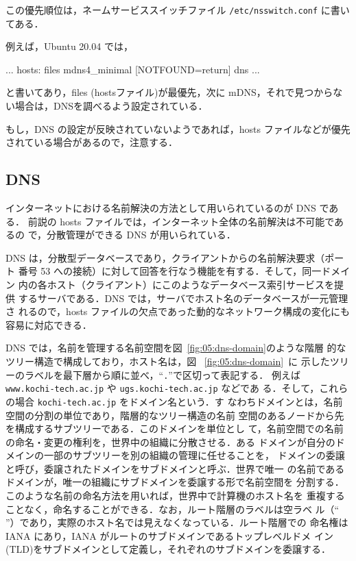 この優先順位は，ネームサービススイッチファイル \texttt{/etc/nsswitch.conf}  に書いてある．

例えば，Ubuntu 20.04 では，
\begin{cli}
...
hosts:          files mdns4_minimal [NOTFOUND=return] dns
...
\end{cli}
と書いてあり，files (hostsファイル)が最優先，次に mDNS，それで見つからない場合は，DNSを調べるよう設定されている．

もし，DNS の設定が反映されていないようであれば，hosts ファイルなどが優先されている場合があるので，注意する．

\subsection*{DNS}
インターネットにおける名前解決の方法として用いられているのが DNS である．
前説の hosts ファイルでは，インターネット全体の名前解決は不可能であるの
で，分散管理ができる DNS が用いられている．

DNS は，分散型データベースであり，クライアントからの名前解決要求（ポート
番号 53 への接続）に対して回答を行なう機能を有する．そして，同一ドメイン
内の各ホスト（クライアント）にこのようなデータベース索引サービスを提供
するサーバである．DNS では，サーバでホスト名のデータベースが一元管理さ
れるので，hosts ファイルの欠点であった動的なネットワーク構成の変化にも
容易に対応できる．

DNS では，名前を管理する名前空間を図~\ref{fig:05:dns-domain}のような階層
的なツリー構造で構成しており，ホスト名は，図~ \ref{fig:05:dns-domain}~に
示したツリーのラベルを最下層から順に並べ，``\verb|.|''で区切って表記する．
例えば \verb|www.kochi-tech.ac.jp| や \verb|ugs.kochi-tech.ac.jp| などであ
る．そして，これらの場合 \verb|kochi-tech.ac.jp| をドメイン名という．す
なわちドメインとは，名前空間の分割の単位であり，階層的なツリー構造の名前
空間のあるノードから先を構成するサブツリーである．このドメインを単位とし
て，名前空間での名前の命名・変更の権利を，世界中の組織に分散させる．ある
ドメインが自分のドメインの一部のサブツリーを別の組織の管理に任せることを，
ドメインの委譲と呼び，委譲されたドメインをサブドメインと呼ぶ．世界で唯一
の名前であるドメインが，唯一の組織にサブドメインを委譲する形で名前空間を
分割する．このような名前の命名方法を用いれば，世界中で計算機のホスト名を
重複することなく，命名することができる．なお，ルート階層のラベルは空ラベ
ル（`` ''）であり，実際のホスト名では見えなくなっている．ルート階層での
命名権は IANA にあり，IANA がルートのサブドメインであるトップレベルドメ
イン(TLD)をサブドメインとして定義し，それぞれのサブドメインを委譲する．
   
